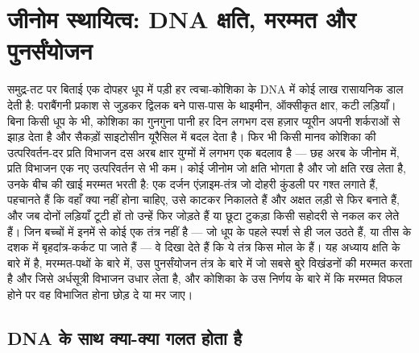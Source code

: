 \chapter{जीनोम स्थायित्व: DNA क्षति, मरम्मत और पुनर्संयोजन}\label{ch:b3:dna-repair}

समुद्र-तट पर बिताई एक दोपहर धूप में पड़ी हर त्वचा-कोशिका के DNA में
कोई लाख रासायनिक  डाल देती है: पराबैंगनी प्रकाश से जुड़कर
द्विलक बने पास-पास के थाइमीन, ऑक्सीकृत क्षार, कटी लड़ियाँ। बिना किसी
धूप के भी, कोशिका का गुनगुना पानी हर दिन लगभग दस हज़ार प्यूरीन अपनी
शर्कराओं से झाड़ देता है और सैकड़ों साइटोसीन यूरैसिल में बदल देता है।
फिर भी किसी मानव कोशिका की उत्परिवर्तन-दर प्रति विभाजन दस अरब क्षार
युग्मों में लगभग एक बदलाव है --- छह अरब के जीनोम में, प्रति विभाजन एक
नए उत्परिवर्तन से भी कम। कोई जीनोम जो क्षति भोगता है और जो क्षति रख
लेता है, उनके बीच की खाई मरम्मत भरती है: एक दर्जन एंज़ाइम-तंत्र जो
दोहरी कुंडली पर गश्त लगाते हैं, पहचानते हैं कि वहाँ क्या नहीं होना
चाहिए, उसे काटकर निकालते हैं और अक्षत लड़ी से फिर बनाते हैं, और जब
दोनों लड़ियाँ टूटी हों तो उन्हें फिर जोड़ते हैं या छूटा टुकड़ा किसी
सहोदरी से नकल कर लेते हैं। जिन बच्चों में इनमें से कोई एक तंत्र नहीं
है --- जो धूप के पहले स्पर्श से ही जल उठते हैं, या तीस के दशक में
बृहदांत्र-कर्कट पा जाते हैं --- वे दिखा देते हैं कि ये तंत्र किस मोल
के हैं। यह अध्याय क्षति के बारे में है, मरम्मत-पथों के बारे में, उस
पुनर्संयोजन तंत्र के बारे में जो सबसे बुरे विखंडनों की मरम्मत करता है
और जिसे अर्धसूत्री विभाजन उधार लेता है, और कोशिका के उस निर्णय के बारे
में कि मरम्मत विफल होने पर वह विभाजित होना छोड़ दे या मर जाए।

\section{DNA के साथ क्या-क्या गलत होता है}

